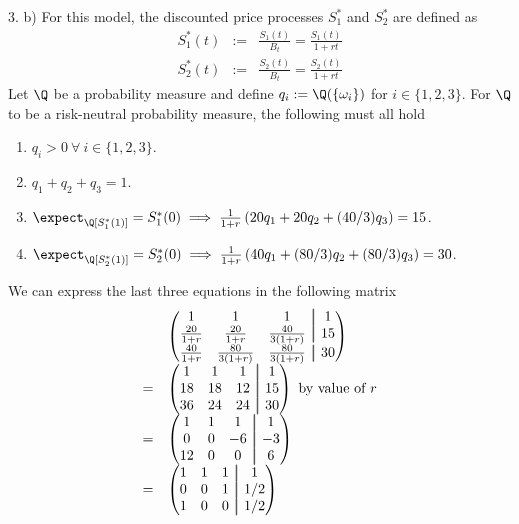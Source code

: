 \documentclass[11pt,a4paper]{article}
\newcommand\aug{\fboxsep=-\fboxrule\!\!\!\fbox{\strut}\!\!\!}
\begin{document}
\begin{answer}{3. b)}
  For this model, the discounted price processes $S_1^*$ and $S_2^*$ are defined as
  \[\begin{array}{rcl}
    S_1^*(t)&:=&\frac{S_1(t)}{B_t}=\frac{S_1(t)}{1+rt}\\
    S_2^*(t)&:=&\frac{S_2(t)}{B_t}=\frac{S_2(t)}{1+rt}
  \end{array}\]
  Let $\Q$ be a probability measure and define $q_i:=\Q(\{\omega_i\})$ for $i\in\{1,2,3\}$. For $\Q$ to be a risk-neutral probability measure, the following must all hold
  \begin{enumerate}
    \item $q_i>0\ \forall\ i\in\{1,2,3\}$.
    \item $q_1+q_2+q_3=1$.
    \item $\expect_\Q[S_1^*(1)]=S_1^*(0)\implies\frac1{1+r}\left(20q_1+20q_2+(40/3)q_3\right)=15$.
    \item $\expect_\Q[S_2^*(1)]=S_2^*(0)\implies\frac1{1+r}\left(40q_1+(80/3)q_2+(80/3)q_3\right)=30$.
  \end{enumerate}
  We can express the last three equations in the following matrix
  \[\begin{array}{rl}
    &\begin{pmatrix}
        1&1&1&\aug&1\\
        \frac{20}{1+r}&\frac{20}{1+r}&\frac{40}{3(1+r)}&\aug&15\\
        \frac{40}{1+r}&\frac{80}{3(1+r)}&\frac{80}{3(1+r)}&\aug&30\\
      \end{pmatrix}\\
    =&\begin{pmatrix}
        1&1&1&\aug&1\\
        18&18&12&\aug&15\\
        36&24&24&\aug&30\\
    \end{pmatrix}\text{ by value of }r\\
    =&\begin{pmatrix}
        1&1&1&\aug&1\\
        0&0&-6&\aug&-3\\
        12&0&0&\aug&6
    \end{pmatrix}\\
    =&\begin{pmatrix}
        1&1&1&\aug&1\\
        0&0&1&\aug&1/2\\
        1&0&0&\aug&1/2

\end{pmatrix}
\end{array}\]
\end{answer}
\end{document}

